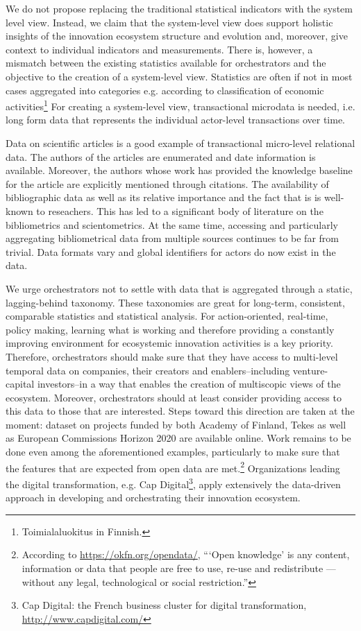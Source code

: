 We do not propose replacing the traditional statistical indicators with the system level view. Instead, we claim that the system-level view does support holistic insights of the innovation ecosystem structure and evolution and, moreover, give context to individual indicators and measurements. There is, however, a mismatch between the existing statistics available for orchestrators and the objective to the creation of a system-level view. Statistics are often if not in most cases aggregated into categories e.g. according to classification of economic activities\footnote{Toimialaluokitus in Finnish.} For creating a system-level view, transactional microdata is needed, i.e. long form data that represents the individual actor-level transactions over time.

Data on scientific articles is a good example of transactional micro-level relational data. The authors of the articles are enumerated and date information is available. Moreover, the authors whose work has provided the knowledge baseline for the article are explicitly mentioned through citations. The availability of bibliographic data as well as its relative importance and the fact that is is well-known to reseachers. This has led to a significant body of literature on the bibliometrics and scientometrics. At the same time, accessing and particularly aggregating bibliometrical data from multiple sources continues to be far from trivial. Data formats vary and global identifiers for actors do now exist in the data.

We urge orchestrators not to settle with data that is aggregated through a static, lagging-behind taxonomy. These taxonomies are great for long-term, consistent, comparable statistics and statistical analysis. For action-oriented, real-time, policy making, learning what is working and therefore providing a constantly improving environment for ecosystemic innovation activities is a key priority. Therefore, orchestrators should make sure that they have access to multi-level temporal data on companies, their creators and enablers--including venture-capital investors--in a way that enables the creation of multiscopic views of the ecosystem. Moreover, orchestrators should at least consider providing access to this data to those that are interested. Steps toward this direction are taken at the moment: dataset on projects funded by both Academy of Finland, Tekes as well as European Commissions Horizon 2020 are available online. Work remains to be done even among the aforementioned examples, particularly to make sure that the features that are expected from open data are met.\footnote{According to \href{Open Knowledge}{https://okfn.org/opendata/}, ``‘Open knowledge’ is any content, information or data that people are free to use, re-use and redistribute — without any legal, technological or social restriction.''} Organizations leading the digital transformation, e.g. Cap Digital\footnote{Cap Digital: the French business cluster for digital transformation, \url{http://www.capdigital.com/}}, apply extensively the data-driven approach in developing and orchestrating their innovation ecosystem.

